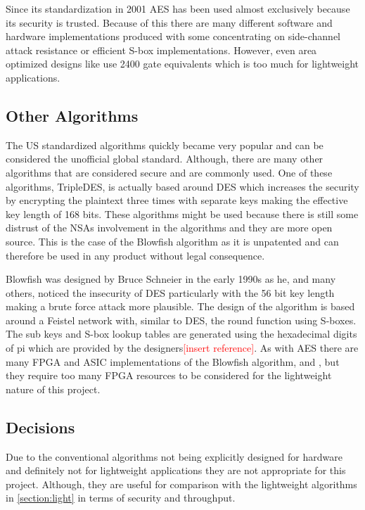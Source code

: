 \documentclass[12pt,twoside,a4paper]{report}
\begin{document}
    Since its standardization in 2001 AES has been used almost exclusively because its security is trusted. Because of this there are many different software and hardware implementations produced with some concentrating on side-channel attack resistance\cite{Strachacki2008} or efficient S-box implementations\cite{Gomes2016}. However, even area optimized designs like \cite{Moradi2011} use 2400 gate equivalents which is too much for lightweight applications.
    
    \subsection{Other Algorithms}
    The US standardized algorithms quickly became very popular and can be considered the unofficial global standard.
    Although, there are many other algorithms that are considered secure and are commonly used. One of these algorithms, TripleDES, is actually based around DES which increases the security by encrypting the plaintext three times with separate keys making the effective key length of 168 bits.
    These algorithms might be used because there is still some distrust of the NSAs involvement in the algorithms and they are more open source. This is the case of the Blowfish algorithm as it is unpatented and can therefore be used in any product without legal consequence.
    
    Blowfish was designed by Bruce Schneier in the early 1990s as he, and many others, noticed the insecurity of DES particularly with the 56 bit key length making a brute force attack more plausible\cite{BruceSchneier1994}. The design of the algorithm is based around a Feistel network with, similar to DES, the round function using S-boxes. The sub keys and S-box lookup tables are generated using the hexadecimal digits of pi which are provided by the designers\textcolor{red}{[insert reference]}. As with AES there are many FPGA and ASIC implementations of the Blowfish algorithm, \cite{Chatterjee2014} and \cite{Prasetyo2014}, but they require too many FPGA resources to be considered for the lightweight nature of this project.
    
    \subsection{Decisions}
    Due to the conventional algorithms not being explicitly designed for hardware and definitely not for lightweight applications they are not appropriate for this project. Although, they are useful for comparison with the lightweight algorithms in \autoref{section:light} in terms of security and throughput.
    
\end{document}
